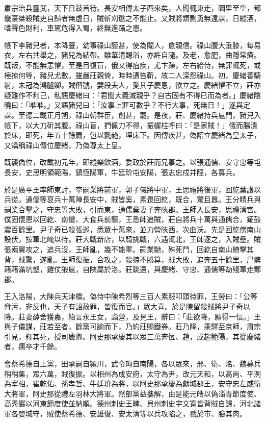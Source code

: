 \begin{pinyinscope}
 肅宗治兵靈武，天下日跂首待。長安相傳太子西來矣，人聞輒東走，圜里至空，都畿豪桀殺賊吏自歸者無虛日，賊斬刈懲之不能止。又賊將類剽勇無遠謀，日縱酒，嗜聲色財利，車駕危得入蜀，終無進躡之患。



 帳下李豬兒者，本降豎，幼事祿山謹甚，使為閹人，愈親信。祿山腹大垂膝，每易衣，左右共舉之，豬兒為結帶。雖華清賜浴，亦許自隨。及老，愈肥，曲隱常瘡。既叛，不能無恚懼，至是目復盲，俄又得疽疾，尤卞躁，左右給侍，無罪輒死，或棰掠何辱，豬兒尤數，雖嚴莊親倚，時時遭笞靳，故二人深怨祿山。初，慶緒善騎射，未冠為鴻臚卿。賊僭號，嬖段夫人，愛其子慶恩，欲立之。慶緒懼不立，莊亦疑難作不利己，私語慶緒曰：「君聞大義滅親乎？自古固有不得已而為者。」慶緒陰曉曰：「唯唯。」又語豬兒曰：「汝事上罪可數乎？不行大事，死無日！」遂與定謀。至德二載正月朔，祿山朝群臣，創甚，罷。是夜，莊、慶緒持兵扈門，豬兒入帳下，以大刀斫其腹。祿山盲，捫佩刀不得，振幄柱呼曰：「是家賊！」俄而腸潰於床，即死，年五十餘罽，包以氈赩，埋床下。因傳疾甚，偽詔立慶緒為皇太子，又矯稱祿山傳位慶緒，乃偽尊太上皇。



 既襲偽位，改載初元年，即縱樂飲酒，委政於莊而兄事之。以張通儒、安守忠等屯長安，史思明領範陽，鎮恆陽軍，牛廷玠屯安陽，張志忠戍井陘，各募兵。



 於是廣平王率師東討，李嗣業將前軍，郭子儀將中軍，王思禮將後軍，回紇葉護以兵從。通儒等裒兵十萬陣長安中，賊皆奚，素畏回紇，既合，驚且囂。王分精兵與嗣業合擊之，守忠等大敗，引而東，通儒棄妻子奔陜郡。王師入長安，思禮清宮。僕固懷恩以回紇、南蠻、大食兵前驅，王悉師追賊，莊自將兵十萬與通儒合，鉦鼓震百餘里。尹子奇已殺張巡，悉眾十萬來，並力營陜西，次曲沃。先是回紇傍南山設伏，按軍北崦以待。莊大戰新店，以騎挑戰，六遇輒北，王師逐之，入賊壘。賊張兩翼攻之，追兵沒，王師亂，幾不能軍。嗣業馳，殊死鬥，回紇自南山繚擊其背，賊驚，遂亂。王師復振，合攻之，殺掠不勝算，賊大敗，追奔五十餘里，尸髀藉藉滿坑壑，鎧仗狼扈，自陜屬於洛。莊跳還，與慶緒、守忠、通儒等劫殘軍走鄴郡。



 王入洛陽，大陳兵天津橋。偽侍中陳希烈等三百人素服叩頭待罪，王勞曰：「公等脅污，非反也，天子有詔赦罪，皆復而官。」眾大喜。於是陳留殺賊將尹子奇以降。莊妻薛舍獲嘉，紿言永王女，詣營，及見王，辭曰：「莊欲降，願得一信。」王與子儀謀，莊若至者，餘黨可諭而下，乃約莊賜鐵券。莊乃降，乘驛至京師，肅宗引見，釋其死，授司農卿。阿史那承慶其以眾三萬奔恆、趙，或趨範陽，其從慶緒者，痍卒才千餘。



 會蔡希德自上黨，田承嗣自潁川，武令珣自南陽，各以眾來，邢、衛、洺、魏募兵稍稍集，眾六萬，賊復振。以相州為成安府，太守為尹，改元天和，以高尚、平洌為宰相，崔乾佑、孫孝哲、牛廷玠為將，以阿史那承慶為獻城郡王，安守忠左威衛大將軍，阿史那從禮左羽林大將軍。然部黨益攜解，由是能元皓以偽淄青節度使、高秀巖以河東節度使並納順。德州刺史王暕、貝州刺史宇文寬皆背賊自歸，河北諸軍各嬰城守，賊使蔡希德、安雄俊、安太清等以兵攻陷之，戮於市、膾其肉。




\end{pinyinscope}
